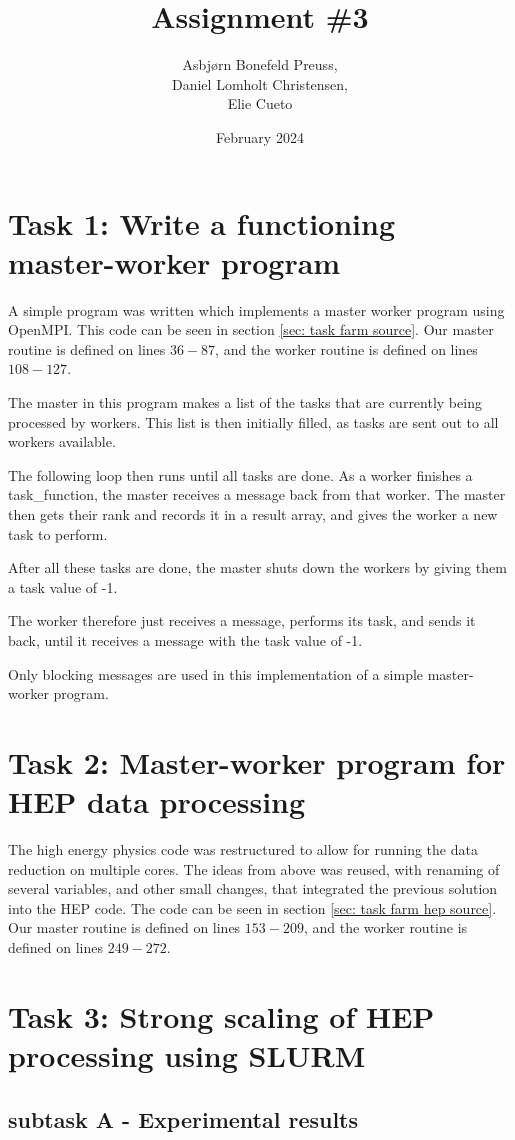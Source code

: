 \documentclass{article}
\title{Assignment \#3}
\author{Asbjørn Bonefeld Preuss,\\ Daniel Lomholt Christensen,\\ Elie Cueto}
\date{February 2024}
\begin{document}
\maketitle
\section{Task 1: Write a functioning master-worker program}
A simple program was written which implements a master worker program using OpenMPI. This code can be seen in section \ref{sec: task farm source}. Our master routine is defined on lines $36-87$, and the worker routine is defined on lines $108-127$. 

The master in this program makes a list of the tasks that are currently being processed by workers. This list is then initially filled, as tasks are sent out to all workers available.

The following loop then runs until all tasks are done.
As a worker finishes a task\_function, the master receives a message back from that worker. The master then gets their rank and records it in a result array, and gives the worker a new task to perform.

After all these tasks are done, the master shuts down the workers by giving them a task value of -1.

The worker therefore just receives a message, performs its task, and sends it back, until it receives a message with the task value of -1.

Only blocking messages are used in this implementation of a simple master-worker program.

\section{Task 2: Master-worker program for HEP data processing} 
The high energy physics code was restructured to allow for running the data reduction on multiple cores. The ideas from above was reused, with renaming of several variables, and other small changes, that integrated the previous solution into the HEP code. The code can be seen in section \ref{sec: task farm hep source}. Our master routine is defined on lines $153-209$, and the worker routine is defined on lines $249-272$. 

\section{Task 3: Strong scaling of HEP processing using SLURM}
\subsection{subtask A - Experimental results}
\end{document}
